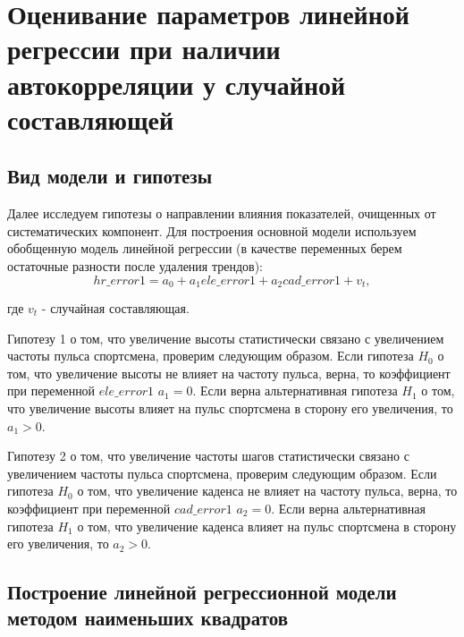 \documentclass[a4paper,12pt]{article}
\begin{document}
\section{Оценивание параметров линейной регрессии при наличии автокорреляции у случайной составляющей}

\subsection{Вид модели и гипотезы}
Далее исследуем гипотезы о направлении влияния показателей, очищенных от систематических компонент. Для построения основной модели используем обобщенную модель линейной регрессии (в качестве переменных берем остаточные разности после удаления трендов):
\[hr\_error1 = a_0 + a_1 ele\_error1 + a_2 cad\_error1 + v_t,\]

где $v_t$ - случайная составляющая.

Гипотезу 1 о том, что увеличение высоты статистически связано с увеличением частоты пульса спортсмена, проверим следующим образом. Если гипотеза $H_0$ о том, что увеличение высоты не влияет на частоту пульса, верна, то коэффициент при переменной $ele\_error1$ $a_1 = 0$. Если верна альтернативная гипотеза $H_1$ о том, что увеличение высоты влияет на пульс спортсмена в сторону его увеличения, то $a_1 > 0$.

Гипотезу 2 о том, что увеличение частоты шагов статистически связано с увеличением частоты пульса спортсмена, проверим следующим образом. Если гипотеза $H_0$ о том, что увеличение каденса не влияет на частоту пульса, верна, то коэффициент при переменной $cad\_error1$ $a_2 = 0$. Если верна альтернативная гипотеза $H_1$ о том, что увеличение каденса влияет на пульс спортсмена в сторону его увеличения, то $a_2 > 0$.

\subsection{Построение линейной регрессионной модели методом наименьших квадратов}
\end{document}
